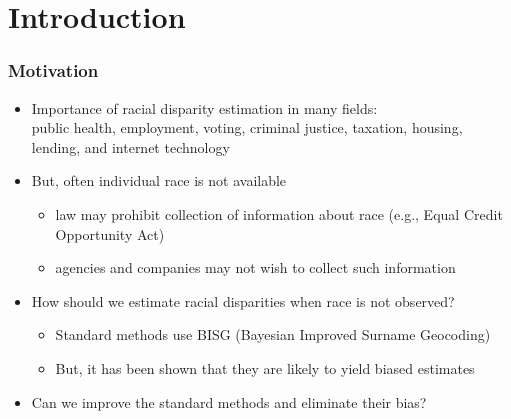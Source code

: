 \documentclass[handout]{beamer}
\title[]{\tit}
\institute[Harvard]{\large Harvard University }
\date{Interdisciplinary Seminar on Social Science Methodology \\
  Interdisciplinary Seminar in Quantitative Methods,\\  University of Michigan\\
  March 10, 2023 \\  \vspace{.25in} Joint work with
  Cory McCartan, Jacob Goldin, and Daniel E. Ho }
\author[Kosuke Imai]{\large Kosuke Imai }
\begin{document}
\frame{\titlepage}



\section{Introduction}

\begin{frame}

  \frametitle{Motivation}

  \begin{itemize}
  \item Importance of racial disparity estimation in many fields:\\
    public health, employment, voting, criminal justice, taxation,
    housing, lending, and internet technology

    \vfill
  \item But, often individual race is not available
    \begin{itemize}
    \item law may prohibit collection of information about race
      (e.g., Equal Credit Opportunity Act)
    \item agencies and companies may not wish to collect such information
    \end{itemize}
    \vfill
  \item How should we estimate racial disparities when race is not
    observed?
    \begin{itemize}
    \item Standard methods use BISG (Bayesian Improved Surname
      Geocoding)
    \item But, it has been shown that they are likely to yield biased estimates
    \end{itemize}

  \item Can we improve the standard methods and eliminate their bias? 
  \end{itemize}

\end{frame}
\end{document}
